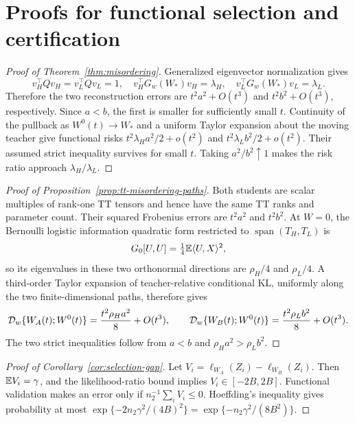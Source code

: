 \section{Proofs for functional selection and certification}
\label{app:secondary-proofs}

\begin{proof}[Proof of Theorem~\ref{thm:misordering}]
Generalized eigenvector normalization gives
\[
v_H^\top Qv_H=v_L^\top Qv_L=1,
\quad v_H^\top G_w(W_*)v_H=\lambda_H,
\quad v_L^\top G_w(W_*)v_L=\lambda_L.
\]
Therefore the two reconstruction errors are \(t^2a^2+O(t^3)\) and \(t^2b^2+O(t^3)\), respectively. Since \(a<b\), the first is smaller for sufficiently small \(t\). Continuity of the pullback as \(W^0(t)\to W_*\) and a uniform Taylor expansion about the moving teacher give functional risks
\(t^2\lambda_Ha^2/2+o(t^2)\) and
\(t^2\lambda_Lb^2/2+o(t^2)\). Their assumed strict inequality survives for small \(t\). Taking \(a^2/b^2\uparrow1\) makes the risk ratio approach \(\lambda_H/\lambda_L\).
\end{proof}

\begin{proof}[Proof of Proposition~\ref{prop:tt-misordering-paths}]
Both students are scalar multiples of rank-one TT tensors and hence have the
same TT ranks and parameter count.  Their squared Frobenius errors are
\(t^2a^2\) and \(t^2b^2\).  At \(W=0\), the Bernoulli logistic information
quadratic form restricted to \(\operatorname{span}(T_H,T_L)\) is
\[
 G_0[U,U]=\tfrac14\mathbb E\langle U,X\rangle^2,
\]
so its eigenvalues in these two orthonormal directions are
\(\rho_H/4\) and \(\rho_L/4\).  A third-order Taylor expansion of
teacher-relative conditional KL, uniformly along the two finite-dimensional
paths, therefore gives
\[
 \mathcal D_w\{W_A(t);W^0(t)\}=\frac{t^2\rho_Ha^2}{8}+O(t^3),\qquad
 \mathcal D_w\{W_B(t);W^0(t)\}=\frac{t^2\rho_Lb^2}{8}+O(t^3).
\]
The two strict inequalities follow from \(a<b\) and
\(\rho_Ha^2>\rho_Lb^2\).
\end{proof}

\begin{proof}[Proof of Corollary~\ref{cor:selection-gap}]
Let \(V_i=\ell_{W_A}(Z_i)-\ell_{W_B}(Z_i)\). Then \(\mathbb E V_i=\gamma\), and the likelihood-ratio bound implies \(V_i\in[-2B,2B]\). Functional validation makes an error only if \(n_2^{-1}\sum_iV_i\le0\). Hoeffding's inequality gives probability at most
\(\exp\{-2n_2\gamma^2/(4B)^2\}=\exp\{-n_2\gamma^2/(8B^2)\}\).
\end{proof}

